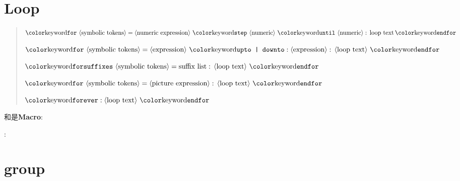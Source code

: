 \section{Loop}

\begin{quote}
$\text{\keyword{for}}\,\lag\text{symbolic tokens}\rag=\lag\text{numeric expression}\rag%
\,\text{\keyword{step}}\,\lag\text{numeric}\rag\,\text{\keyword{until}}\,\lag\text{numeric}\rag:%
\,\text{loop text}\,\text{\keyword{endfor}}$

$\text{\keyword{for}}\,\lag\text{symbolic tokens}\rag=\lag\text{expression}\rag\,\text{\keyword{upto | downto}}:%
\lag\text{expression}\rag:\,\lag\text{loop text}\rag\,\text{\keyword{endfor}}$

$\text{\keyword{forsuffixes}}\,\lag\text{symbolic tokens}\rag=\text{suffix list}:\,\lag\text{loop text}\rag\,%
\text{\keyword{endfor}}$

$\text{\keyword{for}}\,\lag\text{symbolic tokens}\rag=\lag\text{picture expression}\rag:\,\lag\text{%
loop text}\rag\,\text{\keyword{endfor}}$

$\text{\keyword{forever}}:\lag\text{loop text}\rag\,\text{\keyword{endfor}}$
\end{quote}

和是{\bf Macro}:\newline
\indent{}\newline
\indent{}\par

:\quad{}\par

\section{group}
